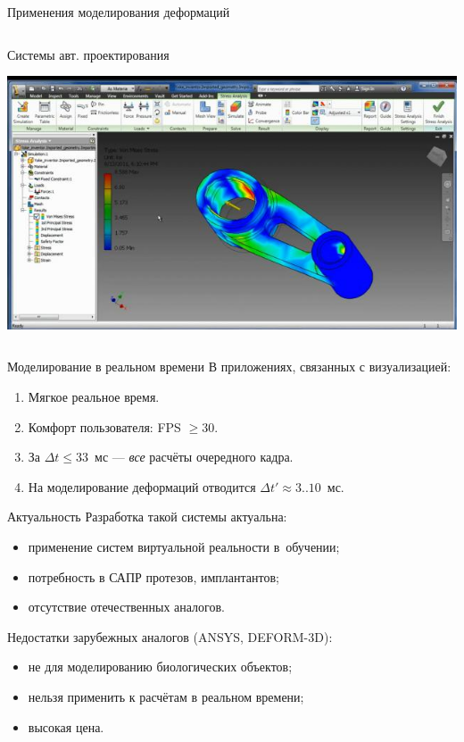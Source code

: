 \documentclass[usenames,dvipsnames,pdftex,unicode,hidelinks]{beamer}
\renewcommand{\le}{\leqslant} %
\renewcommand{\ge}{\geqslant} %
\begin{document}
\begin{frame}{Применения моделирования деформаций}
\begin{columns}[c]
\begin{column}{0.5\textwidth}
\begin{center}
          Системы авт. проектирования

          \includegraphics[height=0.3\textheight]{cad}
        \end{center}
      \end{column}
    \end{columns}
  \end{frame}
  \begin{frame}{Моделирование в реальном времени}
    В приложениях, связанных с визуализацией:
    \begin{enumerate}
      \item Мягкое реальное время.
      \item Комфорт пользователя: FPS $\ge 30$.
      \item За $\Delta t \le 33$~мс --- \emph{все} расчёты очередного кадра.
      \item На моделирование деформаций отводится $\Delta t' \approx 3..10$~мс.
    \end{enumerate}
  \end{frame}

  \begin{frame}{Актуальность}
    Разработка такой системы актуальна:
    \begin{itemize}
      \item применение систем виртуальной реальности в~обучении;
      \item потребность в САПР протезов, имплантантов;
      \item отсутствие отечественных аналогов.
    \end{itemize}

    \vspace{1cm}
    
    Недостатки зарубежных аналогов (ANSYS, DEFORM-3D):
    \begin{itemize}
      \item не для моделированию биологических объектов;
      \item нельзя применить к расчётам в реальном времени;
      \item высокая цена.
    \end{itemize}
  \end{frame}
\end{document}
